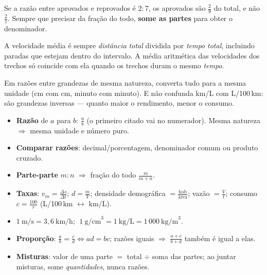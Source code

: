 \begin{atencao}
Se a razão entre aprovados e reprovados é $2 : 7$, os aprovados são
$\frac{2}{9}$ do total, e não $\frac{2}{7}$. Sempre que precisar da fração do
todo, \textbf{some as partes} para obter o denominador.
\end{atencao}

\begin{atencao}
A velocidade média é sempre \emph{distância total} dividida por \emph{tempo
total}, incluindo paradas que estejam dentro do intervalo. A média aritmética
das velocidades dos trechos só coincide com ela quando os trechos duram o mesmo
\emph{tempo}.
\end{atencao}

\begin{atencao}
Em razões entre grandezas de mesma natureza, converta tudo para a mesma
unidade (cm com cm, minuto com minuto). E não confunda km/L com L/100\,km:
são grandezas inversas — quanto maior o rendimento, menor o consumo.
\end{atencao}

\begin{resumo}
\begin{itemize}[leftmargin=1.3em,itemsep=2pt]
  \item \textbf{Razão} de $a$ para $b$: $\frac{a}{b}$ (o primeiro citado vai no numerador).
        Mesma natureza $\Rightarrow$ mesma unidade e número puro.
  \item \textbf{Comparar razões}: decimal/porcentagem, denominador comum ou produto cruzado.
  \item \textbf{Parte-parte} $m : n$ $\Rightarrow$ fração do todo $\frac{m}{m+n}$.
  \item \textbf{Taxas}: $v_m = \frac{\Delta s}{\Delta t}$; $d = \frac{m}{V}$;
        densidade demográfica $=\frac{\text{hab}}{\text{área}}$; vazão $=\frac{V}{t}$;
        consumo $c = \frac{100}{r}$ (L/100\,km $\leftrightarrow$ km/L).
  \item $1~\text{m/s} = 3{,}6~\text{km/h}$; $\;1~\text{g/cm}^3 = 1~\text{kg/L} = 1\,000~\text{kg/m}^3$.
  \item \textbf{Proporção}: $\frac{a}{b} = \frac{c}{d} \iff ad = bc$; razões iguais
        $\Rightarrow$ $\frac{a+c}{b+d}$ também é igual a elas.
  \item \textbf{Misturas}: valor de uma parte $=$ total $\div$ soma das partes; ao juntar
        misturas, some \emph{quantidades}, nunca razões.
\end{itemize}
\end{resumo}

